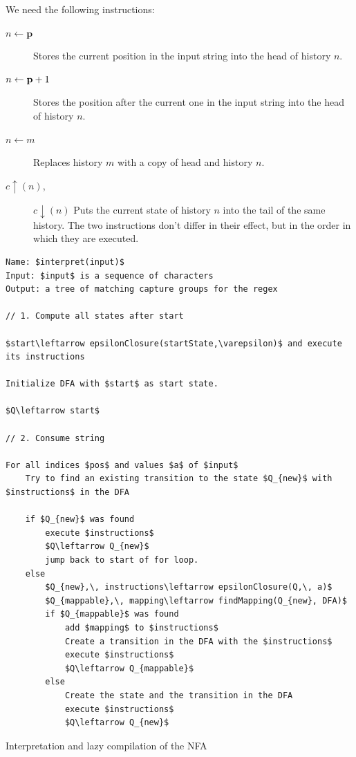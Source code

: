 \documentclass[english]{sigplanconf}
\theoremstyle{definition}
\begin{document}
We need the following instructions:
\begin{description}
\item [{$n\leftarrow\mathbf{p}$}] Stores the current position in the input
string into the head of history $n$.
\item [{$n\leftarrow\mathbf{\mathbf{p}}+1$}] Stores the position after the current one
in the input string into the head of history $n$.
\item [{$n\leftarrow m$}] Replaces history $m$ with a copy of
head and history $n$.
\item [{$c\uparrow(n)$,}] $c\downarrow(n)$ Puts the current state of
history $n$ into the tail of the same history. The
two instructions don't differ in their effect, but in the order in
which they are executed.
\end{description}
\begin{algorithm*}[tb]
\begin{lstlisting}[mathescape,tabsize=2]
Name: $interpret(input)$
Input: $input$ is a sequence of characters
Output: a tree of matching capture groups for the regex

// 1. Compute all states after start

$start\leftarrow epsilonClosure(startState,\varepsilon)$ and execute its instructions

Initialize DFA with $start$ as start state.

$Q\leftarrow start$

// 2. Consume string

For all indices $pos$ and values $a$ of $input$
	Try to find an existing transition to the state $Q_{new}$ with $instructions$ in the DFA

	if $Q_{new}$ was found
		execute $instructions$
		$Q\leftarrow Q_{new}$
		jump back to start of for loop.
	else
		$Q_{new},\, instructions\leftarrow epsilonClosure(Q,\, a)$
		$Q_{mappable},\, mapping\leftarrow findMapping(Q_{new}, DFA)$
		if $Q_{mappable}$ was found
			add $mapping$ to $instructions$
			Create a transition in the DFA with the $instructions$
			execute $instructions$
			$Q\leftarrow Q_{mappable}$
		else
			Create the state and the transition in the DFA
			execute $instructions$
			$Q\leftarrow Q_{new}$
\end{lstlisting}
\caption{Interpretation and lazy compilation of the NFA}
\end{algorithm*}
\end{document}
